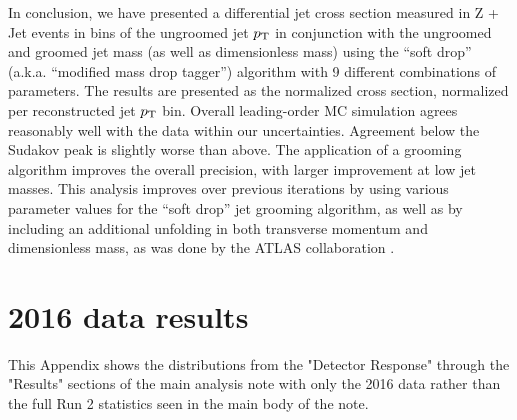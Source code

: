 In conclusion, we have presented a differential jet cross section measured in Z + Jet events in
bins of the ungroomed jet $p_{\mathrm{T}}$ in conjunction with the ungroomed and groomed
jet mass (as well as dimensionless mass) using the ``soft drop'' (a.k.a. ``modified mass drop
tagger'') algorithm with 9 different combinations of parameters. 
The results are presented as the normalized cross section, normalized per reconstructed jet $p_{\mathrm{T}}$ bin. 
Overall leading-order MC simulation agrees
reasonably well with the data within our uncertainties. 
Agreement below the Sudakov peak is slightly
worse than above. The application of a grooming algorithm
improves the overall precision, with larger improvement at low jet masses. 
This analysis improves over previous iterations by using various parameter values for the ``soft drop''
jet grooming algorithm, as well as by including an additional unfolding in both transverse momentum
and dimensionless mass, as was done by the ATLAS collaboration \cite{Aaboud:2017qwh} .





\appendix

\section{2016 data results}

This Appendix shows the distributions from the "Detector Response" through the "Results" sections of the main analysis note with only the 2016 data rather than the full Run 2 statistics seen in the main body of the note.









%


%




















